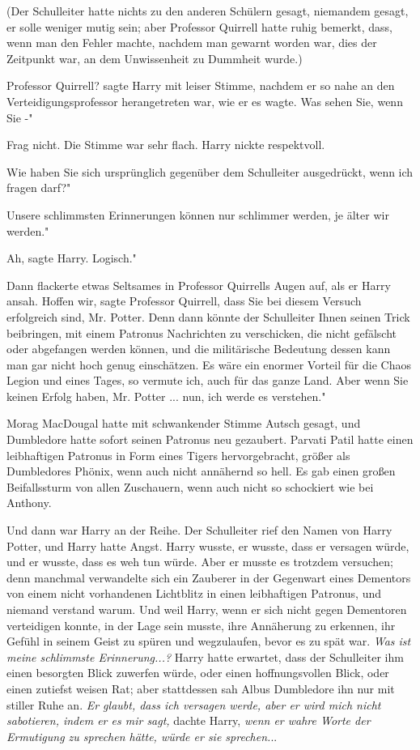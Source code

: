 (Der Schulleiter hatte nichts zu den anderen Schülern gesagt, niemandem gesagt,
er solle weniger mutig sein; aber Professor Quirrell hatte ruhig bemerkt, dass,
wenn man den Fehler machte, nachdem man gewarnt worden war, dies der Zeitpunkt
war, an dem Unwissenheit zu Dummheit wurde.)

\glqq{}Professor Quirrell?\grqq{} sagte Harry mit leiser Stimme, nachdem er so
nahe an den Verteidigungsprofessor herangetreten war, wie er es wagte. \glqq{}Was
sehen Sie, wenn Sie -"

\glqq{}Frag nicht.\grqq{} Die Stimme war sehr flach. Harry nickte respektvoll.

\glqq{}Wie haben Sie sich ursprünglich gegenüber dem Schulleiter ausgedrückt,
wenn ich fragen darf?"

\glqq{}Unsere schlimmsten Erinnerungen können nur schlimmer werden, je älter wir
werden."

\glqq{}Ah\grqq{}, sagte Harry. \glqq{}Logisch."

Dann flackerte etwas Seltsames in Professor Quirrells Augen auf, als er Harry
ansah. \glqq{}Hoffen wir\grqq{}, sagte Professor Quirrell, \glqq{}dass Sie bei
diesem Versuch erfolgreich sind, Mr. Potter. Denn dann könnte der Schulleiter
Ihnen seinen Trick beibringen, mit einem Patronus Nachrichten zu verschicken,
die nicht gefälscht oder abgefangen werden können, und die militärische
Bedeutung dessen kann man gar nicht hoch genug einschätzen. Es wäre ein enormer
Vorteil für die Chaos Legion und eines Tages, so vermute ich, auch für das ganze
Land. Aber wenn Sie keinen Erfolg haben, Mr. Potter ... nun, ich werde es
verstehen."

Morag MacDougal hatte mit schwankender Stimme \glqq{}Autsch\grqq{} gesagt, und
Dumbledore hatte sofort seinen Patronus neu gezaubert. Parvati Patil hatte einen
leibhaftigen Patronus in Form eines Tigers hervorgebracht, größer als
Dumbledores Phönix, wenn auch nicht annähernd so hell. Es gab einen großen
Beifallssturm von allen Zuschauern, wenn auch nicht so schockiert wie bei
Anthony.

Und dann war Harry an der Reihe. Der Schulleiter rief den Namen von Harry
Potter, und Harry hatte Angst. Harry wusste, er wusste, dass er versagen würde,
und er wusste, dass es weh tun würde. Aber er musste es trotzdem versuchen; denn
manchmal verwandelte sich ein Zauberer in der Gegenwart eines Dementors von
einem nicht vorhandenen Lichtblitz in einen leibhaftigen Patronus, und niemand
verstand warum. Und weil Harry, wenn er sich nicht gegen Dementoren verteidigen
konnte, in der Lage sein musste, ihre Annäherung zu erkennen, ihr Gefühl in
seinem Geist zu spüren und wegzulaufen, bevor es zu spät war. \emph{ Was ist
meine schlimmste Erinnerung...?} Harry hatte erwartet, dass der Schulleiter ihm
einen besorgten Blick zuwerfen würde, oder einen hoffnungsvollen Blick, oder
einen zutiefst weisen Rat; aber stattdessen sah Albus Dumbledore ihn nur mit
stiller Ruhe an. \emph{ Er glaubt, dass ich versagen werde, aber er wird mich
nicht sabotieren, indem er es mir sagt,} dachte Harry, \emph{wenn er wahre Worte
der Ermutigung zu sprechen hätte, würde er sie sprechen.}..

